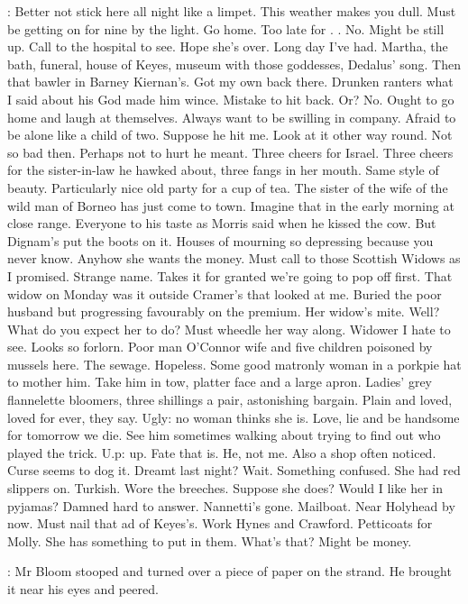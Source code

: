 \Bloom:
Better not stick here all night
like a limpet.
This weather makes you dull.
Must be getting on for nine
by the light.
Go home.
Too late for .
.
No.
Might be still up.
Call to the hospital to see.
Hope she's over.
Long day I've had.
Martha,
the bath,
funeral,
house of Keyes,
museum with those goddesses,
Dedalus' song.
Then that bawler in Barney Kiernan's.
Got my own back there.
Drunken ranters
what I said about his God
made him wince.
Mistake to hit back.
Or?
No.
Ought to go home
and laugh at themselves.
Always want to be swilling in company.
Afraid to be alone
like a child of two.
Suppose he hit me.
Look at it other way round.
Not so bad then.
Perhaps not to hurt
he meant.
Three cheers for Israel.
Three cheers for the sister-in-law he hawked about,
three fangs in her mouth.
Same style of beauty.
Particularly nice old party
for a cup of tea.
The sister
of the wife
of the wild man of Borneo
has just come to town.
Imagine that in the early morning
at close range.
Everyone to his taste
as Morris said
when he kissed the cow.
But Dignam's put the boots on it.
Houses of mourning
so depressing
because you never know.
Anyhow
she wants the money.
Must call to those Scottish Widows as I promised.
Strange name.
Takes it for granted
we're going to pop off first.
That widow on Monday
was it outside Cramer's
that looked at me.
Buried the poor husband
but progressing favourably on the premium.
Her widow's mite.
Well?
What do you expect her to do?
Must wheedle her way along.
Widower
I hate to see.
Looks so forlorn.
Poor man O'Connor
wife and five children
poisoned by mussels here.
The sewage.
Hopeless.
Some good matronly woman in a porkpie hat to mother him.
Take him in tow,
platter face and a large apron.
Ladies' grey flannelette bloomers,
three shillings a pair,
astonishing bargain.
Plain and loved,
loved for ever,
they say.
Ugly:
no woman thinks she is.
Love,
lie
and be handsome
for tomorrow we die.
See him sometimes walking about
trying to find out who played the trick.
U.p:
up.
Fate that is.
He,
not me.
Also
a shop often noticed.
Curse seems to dog it.
Dreamt last night?
Wait.
Something confused.
She had red slippers on.
Turkish.
Wore the breeches.
Suppose she does?
Would I like her in pyjamas?
Damned hard to answer.
Nannetti's gone.
Mailboat.
Near Holyhead by now.
Must nail that ad of Keyes's.
Work Hynes and Crawford.
Petticoats for Molly.
She has something to put in them.
What's that?
Might be money.

:
Mr Bloom stooped
and turned over a piece of paper
on the strand.
He brought it near his eyes and peered.

